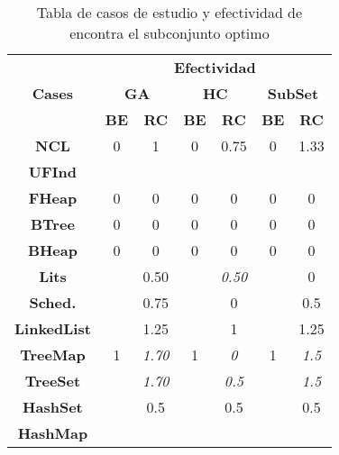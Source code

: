 \begin{table}[t]
\centering
\label{tab:t1}
\scriptsize
\begin{tabular}{|c c|cc|cc|cc|}
\midrule
\multicolumn{2}{|c|}{\multirow{3}{*}{\textbf{Cases}}} & \multicolumn{6}{c|}{\textbf{Efectividad}} \\
\cline{3-8}
\multicolumn{2}{|c|}{} & \multicolumn{2}{c}{\textbf{GA}} & \multicolumn{2}{c}{\textbf{HC}} & \multicolumn{2}{c|}{\textbf{SubSet}} \\
\multicolumn{2}{|c|}{} & \textbf{\tiny{BE}} & \textbf{\tiny{RC}} & \textbf{\tiny{BE}} & \textbf{\tiny{RC}} & \textbf{\tiny{BE}} & \textbf{\tiny{RC}} \\
\midrule
\multicolumn{2}{|c|}{\textbf{NCL}} & 0  &  1 & 0 &  0.75 &0 &  1.33 \\
\midrule
\multicolumn{2}{|c|}{\textbf{UFInd}}&   &   &   &   &   &      \\
\midrule

\multicolumn{2}{|c|}{\textbf{FHeap}}& 0 & 0  &  0 &  0 &  0 &  0   \\
\midrule

\multicolumn{2}{|c|}{\textbf{BTree}} & 0 & 0  &  0 &  0 &  0 &  0  \\
\midrule

\multicolumn{2}{|c|}{\textbf{BHeap}}& 0 & 0  &  0 &  0 &  0 &  0   \\
\midrule

\multicolumn{2}{|c|}{\textbf{Lits}} &   & 0.50  &   & \cellcolor{gray!25}\emph{0.50}   &   & 0   \\
\midrule

\multicolumn{2}{|c|}{\textbf{Sched.}} &   & 0.75   &   &  0 &   & 0.5   \\

\midrule
\multicolumn{2}{|c|}{\textbf{LinkedList}} &  &  1.25 &   &  1 &  &  1.25  \\
\midrule

\multicolumn{2}{|c|}{\textbf{TreeMap}} &  1 & \cellcolor{gray!25}\emph{1.70}  &  1 &  \cellcolor{gray!25} \emph{0}  & 1 & \cellcolor{gray!25}\emph{1.5}   \\
\midrule

\multicolumn{2}{|c|}{\textbf{TreeSet}} &   &\cellcolor{gray!25} \emph{1.70}  &   &   \cellcolor{gray!25}\emph{0.5}  &  & \cellcolor{gray!25}\emph{1.5}   \\
\midrule

\multicolumn{2}{|c|}{\textbf{HashSet}} &   &0.5   &   &  0.5 &   &  0.5  \\
\midrule

\multicolumn{2}{|c|}{\textbf{HashMap}} &   &   &   &   &   &    \\
\hline
\end{tabular}

\caption{Tabla de casos de estudio y efectividad de encontra el subconjunto optimo}
\label{tab:efectividad}
\end{table}

